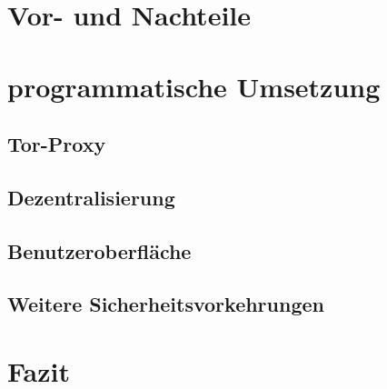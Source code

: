 \documentclass[a4paper,ngerman, headheight=28pt,12pt]{scrartcl}
\begin{document}
\section{Vor- und Nachteile}

\section{programmatische Umsetzung}
\subsection{Tor-Proxy}
\subsection{Dezentralisierung}
\subsection{Benutzeroberfläche}
\subsection{Weitere Sicherheitsvorkehrungen}

\section{Fazit}

\pagebreak
\nolinenumbers{}
\printbibliography{} %
\end{document}
